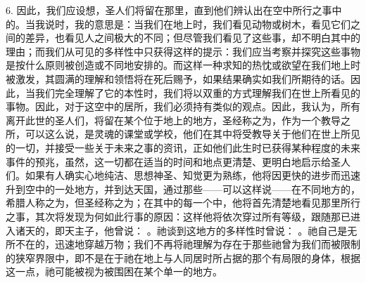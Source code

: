 6. 因此，我们应设想，圣人们将留在那里，直到他们辨认出在空中所行之事中的。当我说时，我的意思是：当我们在地上时，我们看见动物或树木，看见它们之间的差异，也看见人之间极大的不同；但尽管我们看见了这些事，却不明白其中的理由；而我们从可见的多样性中只获得这样的提示：我们应当考察并探究这些事物是按什么原则被创造或不同地安排的。而这样一种求知的热忱或欲望在我们地上时被激发，其圆满的理解和领悟将在死后赐予，如果结果确实如我们所期待的话。因此，当我们完全理解了它的本性时，我们将以双重的方式理解我们在世上所看见的事物。因此，对于这空中的居所，我们必须持有类似的观点。因此，我认为，所有离开此世的圣人们，将留在某个位于地上的地方，圣经称之为，作为一个教导之所，可以这么说，是灵魂的课堂或学校，他们在其中将受教导关于他们在世上所见的一切，并接受一些关于未来之事的资讯，正如他们此生时已获得某种程度的未来事件的预兆，虽然，这一切都在适当的时间和地点更清楚、更明白地启示给圣人们。如果有人确实心地纯洁、思想神圣、知觉更为熟练，他将因更快的进步而迅速升到空中的一处地方，并到达天国，通过那些——可以这样说——在不同地方的，希腊人称之为，但圣经称之为；在其中的每一个中，他将首先清楚地看见那里所行之事，其次将发现为何如此行事的原因：这样他将依次穿过所有等级，跟随那已进入诸天的，即天主子，他曾说： 。祂谈到这地方的多样性时曾说： 。祂自己是无所不在的，迅速地穿越万物；我们不再将祂理解为存在于那些祂曾为我们而被限制的狭窄界限中，即不是在于祂在地上与人同居时所占据的那个有局限的身体，根据这一点，祂可能被视为被围困在某个单一的地方。\par

